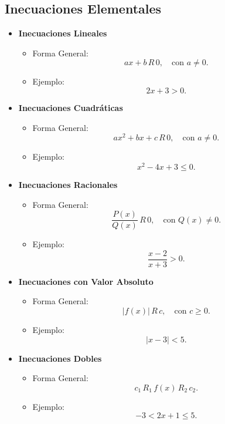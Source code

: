 \documentclass[a4,11pt]{aleph-notas}
\begin{document}
\subsection*{Inecuaciones Elementales}
\begin{itemize}
    \item \textbf{Inecuaciones Lineales}
    \begin{itemize}
        \item Forma General: $$ax + b \, R \, 0, \quad \text{con } a \neq 0.$$
        \item Ejemplo: $$2x + 3 > 0.$$
    \end{itemize}
    
    \item \textbf{Inecuaciones Cuadráticas}
    \begin{itemize}
        \item Forma General: $$ax^2 + bx + c \, R \, 0, \quad \text{con } a \neq 0.$$
        \item Ejemplo: $$x^2 - 4x + 3 \leq 0.$$
    \end{itemize}
    
    \item \textbf{Inecuaciones Racionales}
    \begin{itemize}
        \item Forma General: $$\frac{P(x)}{Q(x)} \, R \, 0, \quad \text{con } Q(x) \neq 0.$$
        \item Ejemplo: $$\frac{x - 2}{x + 3} > 0.$$
    \end{itemize}
    
    \item \textbf{Inecuaciones con Valor Absoluto}
    \begin{itemize}
        \item Forma General: $$|f(x)| \, R \, c, \quad \text{con } c \geq 0.$$
        \item Ejemplo: $$|x - 3| < 5.$$
    \end{itemize}
    
    \item \textbf{Inecuaciones Dobles}
    \begin{itemize}
        \item Forma General: $$c_1 \, R_1 \, f(x) \, R_2 \, c_2.$$
        \item Ejemplo: $$-3 < 2x + 1 \leq 5.$$
    \end{itemize}
\end{itemize}


\end{document}
